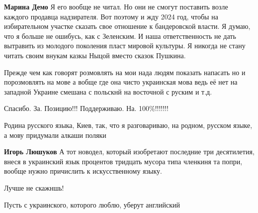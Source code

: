 \begin{itemize}
\begin{itemize}

\textbf{Марина Демо} Я его вообще не читал. Но они не смогут поставить возле
каждого продавца надзирателя. Вот поэтому и жду 2024 год, чтобы на
избирательном участке сказать свое отношение к бандеровской власти. Я думаю,
что я больше не ошибусь, как с Зеленским. И наша ответственность не дать
вытравить из молодого поколения пласт мировой культуры. Я никогда не стану
читать своим внукам казкы Ныцой вместо сказок Пушкина.

\end{itemize}



Прежде чем как говорят розмовлять на мои нада людям показать напасать но и
порозмовлять на мове а вобще где она чисто украинская мова ведь её нет на
западной Украине смешана с польскнй на восточной с руским и т.д.


Спасибо. За. Позицию!!! Поддерживаю. На. 100\%!!!!!!!


Родина русского языка, Киев, так, что я разговариваю, на родном, русском языке, а мову придумали алкаши поляки

\begin{itemize}

\textbf{Игорь Люшуков} А тот новодел, который изобретают последние три
десятилетия, внеся в украинский язык процентов тридцать мусора типа членкиня та
попри, вообще нужно причислить к искусственному языку.
\end{itemize}


Лучше не скажншь!


Пусть с украинского, которого люблю, уберут английский



\end{itemize}
